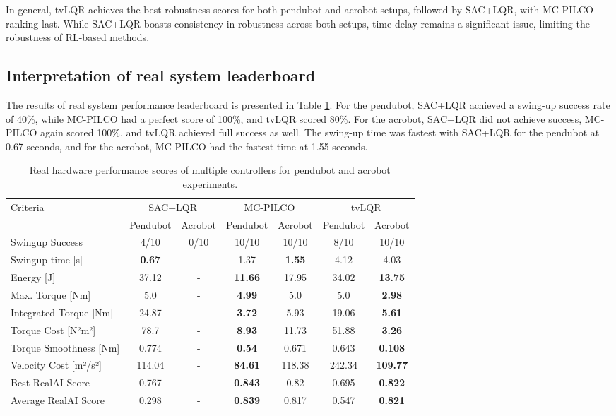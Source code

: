 In general, tvLQR achieves the best robustness scores for both pendubot and acrobot setups, followed by SAC+LQR, with MC-PILCO ranking last. While SAC+LQR boasts consistency in robustness across both setups, time delay remains a significant issue, limiting the robustness of RL-based methods.

\subsection{Interpretation of real system leaderboard}
The results of real system performance leaderboard is presented in Table \ref{tab:performance_real}. For the pendubot, SAC+LQR achieved a swing-up success rate of 40\%, while MC-PILCO had a perfect score of 100\%, and tvLQR scored 80\%. For the acrobot, SAC+LQR did not achieve success, MC-PILCO again scored 100\%, and tvLQR achieved full success as well. The swing-up time was fastest with SAC+LQR for the pendubot at 0.67 seconds, and for the acrobot, MC-PILCO had the fastest time at 1.55 seconds.

\begin{table}[H]
  \centering
 \begin{tabular}{lcccccc}
 \hline
 Criteria & \multicolumn{2}{c}{SAC+LQR} & \multicolumn{2}{c}{MC-PILCO} & \multicolumn{2}{c}{tvLQR} \\
 & Pendubot & Acrobot & Pendubot & Acrobot & Pendubot & Acrobot \\
 \hline
 Swingup Success & 4/10 & 0/10 & 10/10 & 10/10 & 8/10 & 10/10 \\
 Swingup time [s] & \textbf{0.67} & - & 1.37 & \textbf{1.55} & 4.12 & 4.03 \\
 Energy [J] & 37.12 & - & \textbf{11.66} & 17.95 & 34.02 & \textbf{13.75} \\
 Max. Torque [Nm] & 5.0 & - & \textbf{4.99} & 5.0 & 5.0 & \textbf{2.98} \\
 Integrated Torque [Nm] & 24.87 & - & \textbf{3.72} & 5.93 & 19.06 & \textbf{5.61} \\
 Torque Cost [N²m²] & 78.7 & - & \textbf{8.93} & 11.73 & 51.88 & \textbf{3.26} \\
 Torque Smoothness [Nm] & 0.774 & - & \textbf{0.54} & 0.671 & 0.643 & \textbf{0.108} \\
 Velocity Cost [m²/s²] & 114.04 & - & \textbf{84.61} & 118.38 & 242.34 & \textbf{109.77} \\
 Best RealAI Score & 0.767 & - & \textbf{0.843} & 0.82 & 0.695 & \textbf{0.822} \\
 Average RealAI Score & 0.298 & - & \textbf{0.839} & 0.817 & 0.547 & \textbf{0.821} \\
 \hline
 \end{tabular}
 \caption{Real hardware performance scores of multiple controllers for pendubot and acrobot experiments.}
 \label{tab:performance_real}
\end{table}

